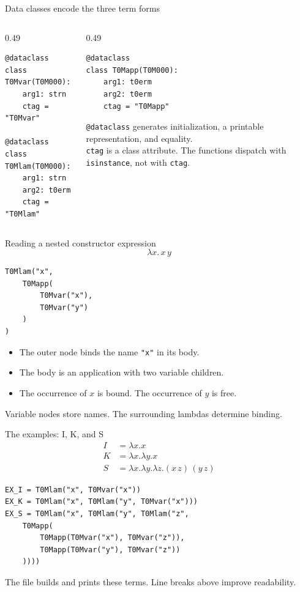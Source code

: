 \documentclass[aspectratio=169,11pt]{beamer}
\begin{document}
\begin{frame}[fragile]{Data classes encode the three term forms}
\begin{columns}[T]
\begin{column}{0.49\textwidth}
\begin{lstlisting}
@dataclass
class T0Mvar(T0M000):
    arg1: strn
    ctag = "T0Mvar"

@dataclass
class T0Mlam(T0M000):
    arg1: strn
    arg2: t0erm
    ctag = "T0Mlam"
\end{lstlisting}
\end{column}
\begin{column}{0.49\textwidth}
\begin{lstlisting}
@dataclass
class T0Mapp(T0M000):
    arg1: t0erm
    arg2: t0erm
    ctag = "T0Mapp"
\end{lstlisting}
\medskip
\texttt{@dataclass} generates initialization, a printable representation, and equality.\\[0.7em]
\texttt{ctag} is a class attribute. The functions dispatch with \texttt{isinstance}, not with \texttt{ctag}.
\end{column}
\end{columns}
\end{frame}

\begin{frame}[fragile]{Reading a nested constructor expression}
\[
\lambda x.\,x\,y
\]
\begin{lstlisting}
T0Mlam("x",
    T0Mapp(
        T0Mvar("x"),
        T0Mvar("y")
    )
)
\end{lstlisting}
\begin{itemize}
\item The outer node binds the name \texttt{"x"} in its body.
\item The body is an application with two variable children.
\item The occurrence of $x$ is bound. The occurrence of $y$ is free.
\end{itemize}
Variable nodes store names. The surrounding lambdas determine binding.
\end{frame}

\begin{frame}[fragile]{The examples: I, K, and S}
\begin{align*}
I &= \lambda x.x\\
K &= \lambda x.\lambda y.x\\
S &= \lambda x.\lambda y.\lambda z.(x\,z)\,(y\,z)
\end{align*}
\begin{lstlisting}
EX_I = T0Mlam("x", T0Mvar("x"))
EX_K = T0Mlam("x", T0Mlam("y", T0Mvar("x")))
EX_S = T0Mlam("x", T0Mlam("y", T0Mlam("z",
    T0Mapp(
        T0Mapp(T0Mvar("x"), T0Mvar("z")),
        T0Mapp(T0Mvar("y"), T0Mvar("z"))
    ))))
\end{lstlisting}
The file builds and prints these terms. Line breaks above improve readability.
\end{frame}
\end{document}
